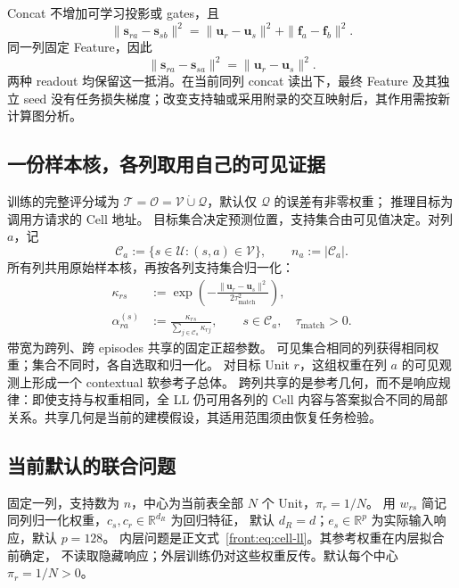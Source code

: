 \documentclass[11pt,UTF8,fontset=fandol]{ctexart}
\numberwithin{equation}{section}
\theoremstyle{definition}
\newcommand{\Rset}{\mathcal U}
\newcommand{\Oset}{\mathcal O}
\newcommand{\Vset}{\mathcal V}
\newcommand{\Qset}{\mathcal Q}
\newcommand{\TargetSet}{\mathcal T}
\newcommand{\coreboxed}[1]{\boxed{#1}}
\begin{document}
Concat 不增加可学习投影或 gates，且
\begin{equation}
 \|\bm s_{ra}-\bm s_{sb}\|^2
 =\|\bm u_r-\bm u_s\|^2+\|\bm f_a-\bm f_b\|^2.
 \label{front:eq:concat-distance}
\end{equation}
同一列固定 Feature，因此
\begin{equation}
 \coreboxed{\|\bm s_{ra}-\bm s_{sa}\|^2=\|\bm u_r-\bm u_s\|^2.}
 \label{front:eq:feature-cancellation}
\end{equation}
两种 readout 均保留这一抵消。在当前同列 concat 读出下，最终 Feature 及其独立 seed
没有任务损失梯度；改变支持轴或采用附录的交互映射后，其作用需按新计算图分析。

\subsection{一份样本核，各列取用自己的可见证据}
训练的完整评分域为 $\TargetSet=\Oset=\Vset\mathbin{\dot\cup}\Qset$，默认仅 $\Qset$ 的误差有非零权重；
推理目标为调用方请求的 Cell 地址。
目标集合决定预测位置，支持集合由可见值决定。对列 $a$，记
\begin{equation}
 \mathcal C_a:=\{s\in\Rset:(s,a)\in\Vset\},\qquad
 n_a:=|\mathcal C_a|.
 \label{front:eq:visible-supports}
\end{equation}
所有列共用原始样本核，再按各列支持集合归一化：
\begin{equation}
\begin{aligned}
 \kappa_{rs}
 &:=\exp\!\left(-\frac{\|\bm u_r-\bm u_s\|^2}
                         {2\tau_{\mathrm{match}}^2}\right),\\
 \alpha_{ra}^{(s)}
 &:=\frac{\kappa_{rs}}{\sum_{j\in\mathcal C_a}\kappa_{rj}},
 \qquad s\in\mathcal C_a,\quad \tau_{\mathrm{match}}>0.
\end{aligned}
\label{front:eq:gaussian-matching}
\end{equation}
带宽为跨列、跨 episodes 共享的固定正超参数。
可见集合相同的列获得相同权重；集合不同时，各自选取和归一化。
对目标 Unit $r$，这组权重在列 $a$ 的可见观测上形成一个 contextual 软参考子总体。
跨列共享的是参考几何，而不是响应规律：即使支持与权重相同，全 LL 仍可用各列的
Cell 内容与答案拟合不同的局部关系。共享几何是当前的建模假设，其适用范围须由恢复任务检验。



\subsection{当前默认的联合问题}
固定一列，支持数为 $n$，中心为当前表全部 $N$ 个 Unit，$\pi_r=1/N$。
用 $w_{rs}$ 简记同列归一化权重，$c_s,c_r\in\mathbb R^{d_R}$ 为回归特征，
默认 $d_R=d$；$e_s\in\mathbb R^p$ 为实际输入响应，默认 $p=128$。
内层问题是正文式~\eqref{front:eq:cell-ll}。其参考权重在内层拟合前确定，
不读取隐藏响应；外层训练仍对这些权重反传。默认每个中心 $\pi_r=1/N>0$。
\end{document}
